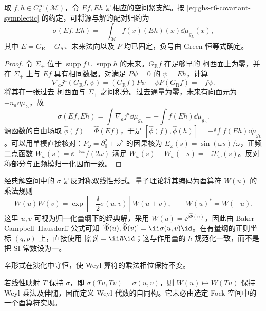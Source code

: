 \begin{proposition}[因果传播与辛配对]\label{prop:ghs-r6-causal-pairing}
取 $f,h\in C_c^\infty(\mathcal M)$，令 $Ef,Eh$ 是相应的空间紧支解。按 \cref{eq:ghs-r6-covariant-symplectic} 的约定，可将源与解的配对归约为
\begin{equation}\label{eq:ghs-r6-peierls}
\sigma(Ef,Eh)=-\int_{\mathcal M}f(x)(Eh)(x)\dd\mu_{g_L}(x),
\end{equation}
其中 $E=G_{\mathrm R}-G_{\mathrm A}$、未来法向以及 $P$ 均已固定，负号由 Green 恒等式确定。
\end{proposition}
\begin{proof}
令 $\Sigma_+$ 位于 $\operatorname{supp}f\cup\operatorname{supp}h$ 的未来。$G_{\mathrm R}f$ 在足够早的 柯西面上为零，并在 $\Sigma_+$ 上与 $Ef$ 具有相同数据。对满足 $P\psi=0$ 的 $\psi=Eh$，计算
\[
\nabla_aj^a(G_{\mathrm R}f,\psi)
=(G_{\mathrm R}f)P\psi-\psi P(G_{\mathrm R}f)=-f\psi.
\]
将其在一张过去 柯西面与 $\Sigma_+$ 之间积分。过去通量为零，未来有向面元为 $+n_a\dd\mu_\Sigma$，故
\[
 \sigma(Ef,Eh)=\int\nabla_aj^a\dd\mu_{g_L}=-\int f(Eh)\dd\mu_{g_L}.
\]
源函数的自由场取 $\widehat\phi(f)=\widehat\Phi(Ef)$，于是 $[\widehat\phi(f),\widehat\phi(h)]=-\ii\int f(Eh)\dd\mu_{g_L}$。可以用单模直接核对：$P_\omega=\partial_0^2+\omega^2$ 的因果核为 $E_\omega(s)=\sin(\omega s)/\omega$，正频二点函数 $W_\omega(s)=\ee^{-\ii\omega s}/(2\omega)$ 满足 $W_\omega(s)-W_\omega(-s)=-\ii E_\omega(s)$。反对称部分与正频模归一化因而一致。
\end{proof}


经典解空间中的 $\sigma$ 是反对称双线性形式。量子理论将其编码为酉算符 $W(u)$ 的乘法规则
\begin{equation}\label{eq:ghs-r6-weyl-algebra}
W(u)W(v)=\exp\!\left[-\frac{\ii}{2}\sigma(u,v)\right]W(u+v),
\qquad W(u)^*=W(-u).
\end{equation}
这里 $u,v$ 可视为归一化量纲下的经典解，采用 $W(u)=\ee^{\ii\widehat\Phi(u)}$，因此由 Baker--Campbell--Hausdorff 公式可知 $[\widehat\Phi(u),\widehat\Phi(v)]=\ii\sigma(u,v)\id$。在有量纲的正则坐标 $(q,p)$ 上，直接使用 $[\widehat q,\widehat p]=\ii\hbar\id$；这与作用量的 $\hbar$ 规范化一致，而不是把 SI 常数设为一。



辛形式在演化中守恒，使 Weyl 算符的乘法相位保持不变。

\begin{proposition}[辛变换诱导场代数自同构]
\label{prop:ghs-r6-symplectic-automorphism}
若线性映射 $T$ 保持 $\sigma$，即 $\sigma(Tu,Tv)=\sigma(u,v)$，则 $W(u)\mapsto W(Tu)$ 保持 Weyl 乘法及伴随，因而定义 Weyl 代数的自同构。它未必由选定 Fock 空间中的一个酉算符实现。
\end{proposition}

